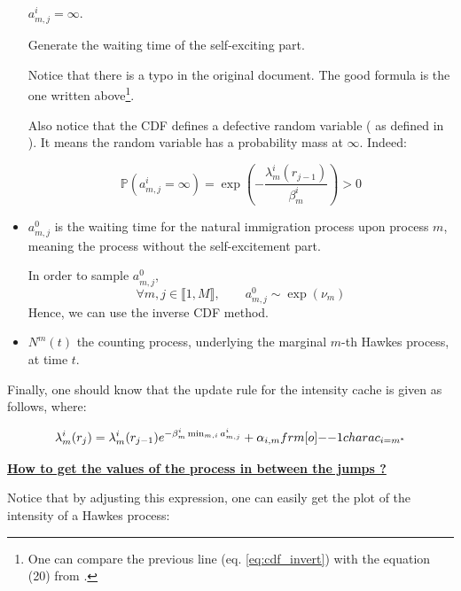 \documentclass[11pt]{book}
\begin{document}
\begin{itemize}
\begin{algorithm}[H]
{$ a ^i_{m,j} = \infty $.}
\caption{Generate the waiting time of the self-exciting part.}
\end{algorithm}


Notice that there is a typo in the original document. The good formula is the one written above\footnote{One can compare the previous line (eq. \ref{eq:cdf_invert}) with the equation (20) from \cite{my_algo_simul}.}.

Also notice that the CDF defines a defective random variable ( as defined in \cite{my_algo_simul}). It means the random variable has a probability mass at $\infty$. Indeed:

$$ \mathbb P ( a^i_{m,j} = \infty ) = \exp \left ( - \frac { \lambda^i_m ( r_{j-1} ) } { \beta_m^i } \right ) > 0 $$



\item $a_{m,j}^0$ is the waiting time for the natural immigration process upon process $m$, meaning the process without the self-excitement part. 

\begin{remarque}
In order to sample $a^0_{m,j}$,
$$\forall m,j \in  \llbracket 1, M \rrbracket, \qquad a_{m,j}^0 \sim \exp( \nu_m )$$
Hence, we can use the inverse CDF method. 
\end{remarque}

\item $N^{m} (t) $ the counting process, underlying the marginal $m$-th Hawkes process, at time $t$.
\end{itemize}


Finally, one should know that the update rule for the intensity cache is given as follows, where:

\begin{equation}
\lambda_m^i ( r_j ) = \lambda_m^i ( r_{j-1} )  e^{ - \beta_m^i \min_{m,i} a_{m,j}^i } + \alpha_{i,m} \11charac_{i = m^*}
\label{eq:update_lambda} 
\end{equation}

\underline{ \textbf{How to get the values of the process in between the jumps ?} }

Notice that by adjusting this expression, one can easily get the plot of the intensity of a Hawkes process:
\end{document}
